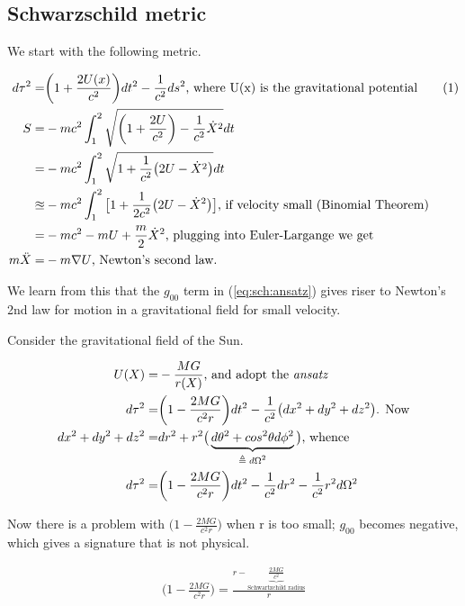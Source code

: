 \documentclass[]{article}
\newcommand\numberthis{\addtocounter{equation}{1}\tag{\theequation}}
\begin{document}
{\subsection{Schwarzschild metric}

We start with the following metric.

\begin{align*}
	d \tau^2 =& \bigg(1+\frac{2 U(x)}{c^2}\bigg) dt^2 - \frac{1}{c^2} ds^2 \text{, where U(x) is the gravitational potential} \numberthis \label{eq:sch:ansatz}\\
	S =& -m c^2 \int_{1}^{2} \sqrt{\bigg(1+\frac{2U}{c^2}\bigg) - \frac{1}{c^2}\dot{X}^2} dt\\
	=& -m c^2 \int_{1}^{2} \sqrt{1 +\frac{1}{c^2}\big(2U-\dot{X}^2\big)} dt\\
	\approxeq& -m c^2 \int_{1}^{2} \big[1 + \frac{1}{2c^2}\big(2U-\dot{X}^2\big)\big] \text{, if velocity small (Binomial Theorem)}\\
	=& -m c^2 -mU + \frac{m}{2} \dot{X}^2 \text{, plugging into Euler-Largange we get}\\
	m\ddot{X} =& -m \nabla U \text{, Newton's second law.}
\end{align*}

We learn from this that the $g_{00}$ term in (\ref{eq:sch:ansatz}) gives riser to Newton's 2nd law for motion in a gravitational field for small velocity.

Consider the gravitational field of the Sun.

\begin{align*}
	U(X) =& - \frac{MG}{r(X)} \text{, and adopt the \emph{ansatz}}\\
		d \tau^2 =& \bigg(1-\frac{2 MG}{c^2 r}\bigg) dt^2 - \frac{1}{c^2} \big(dx^2 + dy^2 +dz^2\big) \text{. Now}\\
		dx^2 + dy^2 +dz^2 =& dr^2 + r^2 \big(\underbrace{d\theta^2 + cos^2 \theta d\phi^2}_\text{$\triangleq d\Omega^2$}\big) \text{, whence}\\
		d \tau^2 =& \bigg(1-\frac{2 MG}{c^2 r}\bigg) dt^2 - \frac{1}{c^2}dr^2 - \frac{1}{c^2} r^2 d\Omega^2
\end{align*}

Now there is a problem with $\bigg(1-\frac{2 MG}{c^2 r}\bigg)$ when r is too small; $g_00$ becomes negative, which gives a signature that is not physical.

\begin{align*}
	\bigg(1-\frac{2 MG}{c^2 r}\bigg) = \frac{r-\underbrace{\frac{2 MG}{c^2}}_\text{Schwartzchild radius}}{r}
\end{align*}

}
\end{document}
